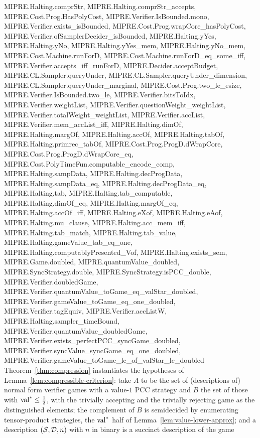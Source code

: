 \begin{remark}
{  MIPRE.Halting.comprStr, MIPRE.Halting.comprStr_accepts,
  MIPRE.Cost.Prog.HasPolyCost, MIPRE.Verifier.IsBounded.mono,
  MIPRE.Verifier.exists_isBounded, MIPRE.Cost.Prog.wrapCore_hasPolyCost,
  MIPRE.Verifier.ofSamplerDecider_isBounded, MIPRE.Halting.yYes, MIPRE.Halting.yNo,
  MIPRE.Halting.yYes_mem, MIPRE.Halting.yNo_mem, MIPRE.Cost.Machine.runForD,
  MIPRE.Cost.Machine.runForD_eq_some_iff, MIPRE.Verifier.accepts_iff_runForD,
  MIPRE.Decider.acceptBudget, MIPRE.CL.Sampler.queryUnder,
  MIPRE.CL.Sampler.queryUnder_dimension, MIPRE.CL.Sampler.queryUnder_marginal,
  MIPRE.Cost.Prog.two_le_esize, MIPRE.Verifier.IsBounded.two_le,
  MIPRE.Verifier.bitsToIdx, MIPRE.Verifier.weightList,
  MIPRE.Verifier.questionWeight_weightList, MIPRE.Verifier.totalWeight_weightList,
  MIPRE.Verifier.accList, MIPRE.Verifier.mem_accList_iff, MIPRE.Halting.dimOf,
  MIPRE.Halting.margOf, MIPRE.Halting.accOf, MIPRE.Halting.tabOf,
  MIPRE.Halting.primrec_tabOf, MIPRE.Cost.Prog.ProgD.dWrapCore,
  MIPRE.Cost.Prog.ProgD.dWrapCore_eq, MIPRE.Cost.PolyTimeFun.computable_encode_comp,
  MIPRE.Halting.sampData, MIPRE.Halting.decProgData, MIPRE.Halting.sampData_eq,
  MIPRE.Halting.decProgData_eq, MIPRE.Halting.tab, MIPRE.Halting.tab_computable,
  MIPRE.Halting.dimOf_eq, MIPRE.Halting.margOf_eq, MIPRE.Halting.accOf_iff,
  MIPRE.Halting.eXof, MIPRE.Halting.eAof, MIPRE.Halting.mu_clause,
  MIPRE.Halting.acc_mem_iff, MIPRE.Halting.tab_match, MIPRE.Halting.tab_value,
  MIPRE.Halting.gameValue_tab_eq_one, MIPRE.Halting.computablyPresented_Vof,
  MIPRE.Halting.exists_sem, MIPRE.Game.doubled, MIPRE.quantumValue_doubled,
  MIPRE.SyncStrategy.double, MIPRE.SyncStrategy.isPCC_double,
  MIPRE.Verifier.doubledGame, MIPRE.Verifier.quantumValue_toGame_eq_valStar_doubled,
  MIPRE.Verifier.gameValue_toGame_eq_one_doubled, MIPRE.Verifier.tagEquiv,
  MIPRE.Verifier.accListW, MIPRE.Halting.sampler_timeBound,
  MIPRE.Verifier.quantumValue_doubledGame,
  MIPRE.Verifier.exists_perfectPCC_syncGame_doubled,
  MIPRE.Verifier.syncValue_syncGame_eq_one_doubled,
  MIPRE.Verifier.gameValue_toGame_le_of_valStar_le_doubled}
Theorem~\ref{thm:compression} instantiates the hypotheses of
Lemma~\ref{lem:compressible-criterion}: take $A$ to be the set of (descriptions of) normal
form verifier games with a value-$1$ PCC strategy and $B$ the set of those with $\mathrm{val}^*
\leq \frac12$, with the trivially accepting and the trivially rejecting game as the
distinguished elements; the complement of $B$ is semidecided by enumerating tensor-product
strategies, the $\mathrm{val}^*$ half of Lemma~\ref{lem:value-lower-approx}; and a description
$(\mathcal{S}, \mathcal{D}, n)$ with $n$ in binary is a succinct description of the game

\end{remark}
